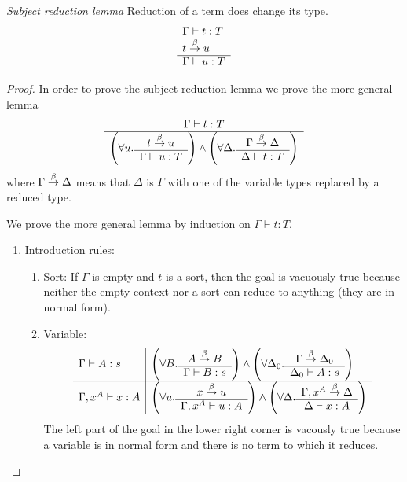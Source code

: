 \begin{theorem}
    \label{SubjectReductionTheorem}
    \emph{Subject reduction lemma} Reduction of a term does change its type.
    $$
    \begin{array}{l} 
        \Gamma \vdash t: T
        \\
        t \stackrel{\beta}{\to} u
     \\ \hline 
        \Gamma \vdash u: T
    \end{array}
    $$

    {
    \def\SRLeftPart#1#2#3#4{
        \left(
        \forall #1.
        \ruleh{#2 \reduce #1}{#3 \vdash #1: #4}
        \right)
    }
    \def\SRRightPart#1#2#3#4{
        \left(
        \forall #1.
        \ruleh{#2 \reduce #1}{#1 \vdash #3: #4}
        \right)
    }

    \begin{proof} In order to prove the subject reduction lemma we prove the
        more general lemma
        $$
        \ruleh{
            \Gamma \vdash t: T
        }
        {
            \SRLeftPart u t \Gamma T
            \land
            \SRRightPart \Delta \Gamma t T
        }
        $$
        where $\Gamma \stackrel{\beta}{\to} \Delta$ means that $\Delta$ is $\Gamma$ with one
        of the variable types replaced by a reduced type.

        We prove the more general lemma by induction on $\Gamma \vdash t: T$.
        \begin{enumerate}
            \item Introduction rules:
            \begin{enumerate}
                \item Sort: If $\Gamma$ is empty and $t$ is a sort, then the
                    goal is vacuously true because neither the empty context nor
                    a sort can reduce to anything (they are in normal form).

                \item Variable:
                    $$
                    \begin{array}{l|l}
                        \Gamma \vdash A : s
                        &
                        \SRLeftPart B A \Gamma s
                        \land
                        \SRRightPart {\Delta_0} \Gamma A s
                        \\
                        \hline
                        \Gamma, x^A \vdash x: A
                        &
                        \SRLeftPart u x {\Gamma,x^A} A
                        \land
                        \SRRightPart \Delta {\Gamma,x^A} x A
                    \end{array}
                    $$
                    The left part of the goal in the lower right corner is
                    vacously true because a variable is in normal form and there
                    is no term to which it reduces.


\end{enumerate}
\end{enumerate}
\end{proof}}
\end{theorem}
